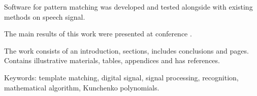 Software for pattern matching was developed and tested alongside with existing methods on speech signal.

The main results of this work were presented at conference .

The work consists of an introduction,  sections, includes conclusions and  pages.
Contains  illustrative materials,  tables,  appendices and has
 references.

Keywords: template matching, digital signal, signal processing, recognition, mathematical algorithm, Kunchenko
polynomials.


